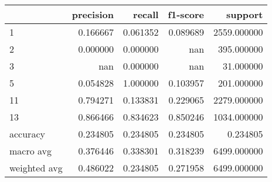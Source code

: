 \begin{tabular}{lrrrr}
\toprule
 & precision & recall & f1-score & support \\
\midrule
1 & 0.166667 & 0.061352 & 0.089689 & 2559.000000 \\
2 & 0.000000 & 0.000000 & nan & 395.000000 \\
3 & nan & 0.000000 & nan & 31.000000 \\
5 & 0.054828 & 1.000000 & 0.103957 & 201.000000 \\
11 & 0.794271 & 0.133831 & 0.229065 & 2279.000000 \\
13 & 0.866466 & 0.834623 & 0.850246 & 1034.000000 \\
accuracy & 0.234805 & 0.234805 & 0.234805 & 0.234805 \\
macro avg & 0.376446 & 0.338301 & 0.318239 & 6499.000000 \\
weighted avg & 0.486022 & 0.234805 & 0.271958 & 6499.000000 \\
\bottomrule
\end{tabular}
